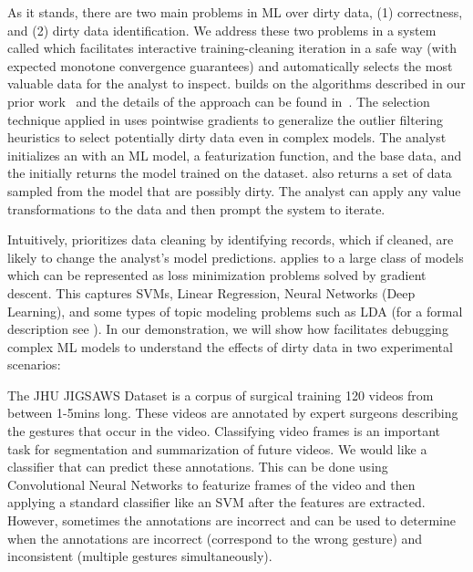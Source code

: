 As it stands, there are two main problems in ML over dirty data, (1) correctness, and (2) dirty data identification.
We address these two problems in a system called \sys which facilitates interactive training-cleaning iteration in a safe way (with expected monotone convergence guarantees) and automatically selects the most valuable data for the analyst to inspect.
\sys builds on the algorithms described in our prior work~\cite{krishnan2015svc, wang1999sample, DBLP:journals/pvldb/HaasKWF015, DBLP:journals/debu/KrishnanWFGKM015} and the details of the approach can be found in~\cite{activecleanarxiv}.
The selection technique applied in \sys uses pointwise gradients to generalize the outlier filtering heuristics to select potentially dirty data even in complex models. 
The analyst initializes an \sys with an ML model, a featurization function, and the base data, and the \sys initially returns the model trained on the dataset.
\sys also returns a set of data sampled from the model that are possibly dirty.
The analyst can apply any value transformations to the data and then prompt the system to iterate. 

Intuitively, \sys prioritizes data cleaning by identifying records, which if cleaned, are likely to change the analyst's model predictions.
\sys applies to a large class of models which can be represented as loss minimization problems solved by gradient descent.
This captures SVMs, Linear Regression, Neural Networks (Deep Learning), and some types of topic modeling problems such as LDA (for a formal description see \cite{activecleanarxiv}).
In our demonstration, we will show how \sys facilitates debugging complex ML models to understand the effects of dirty data in two experimental scenarios: 

\begin{example}\sloppy
The JHU JIGSAWS Dataset is a corpus of surgical training 120 videos from between 1-5mins long.
These videos are annotated by expert surgeons describing the gestures that occur in the video. 
Classifying video frames is an important task for segmentation and summarization of future videos.
We would like a classifier that can predict these annotations.
This can be done using Convolutional Neural Networks to featurize frames of the video and then applying a standard classifier like an SVM after the features are extracted.
However, sometimes the annotations are incorrect and \sys can be used to determine when the annotations are incorrect (correspond to the wrong gesture) and inconsistent (multiple gestures simultaneously).
\end{example}

